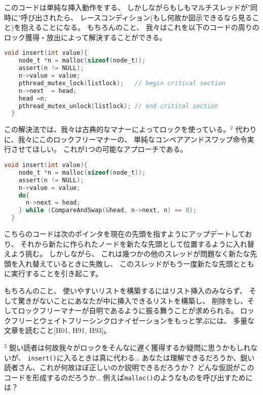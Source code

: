 \documentclass[11pt,a4paper, uplatex]{jsarticle}
\begin{document}
このコードは単純な挿入動作をする、
しかしながらもしもマルチスレッドが"同時に"呼び出されたら、
レースコンディション(もし何故か図示できるなら見ること)を抱えることになる。
もちろんのこと、
我々はこれを以下のコードの周りのロック獲得・放出によって解決することができる。


\begin{lstlisting}[language=c]
  void insert(int value){
    node_t *n = malloc(sizeof(node_t));
    assert(n != NULL);
    n->value = value;
    pthread_mutex_lock(listlock);   // begin critical section
    n->next  = head;
    head =n;
    pthread_mutex_unlock(listlock); // end critical section
  }
\end{lstlisting}

この解決法では、我々は古典的なマナーによってロックを使っている。${}^\text{2}$
代わりに、我々にこのロックフリーマナーの、
単純なコンペアアンドスワップ命令実行させてほしい。
これが1つの可能なアプローチである。


\begin{lstlisting}[language=c]
  void insert(int value){
    node_t *n = malloc(sizeof(node_t));
    assert(n != NULL);
    n->value = value;
    do{
      n->next = head;
    } while (CompareAndSwap(&head, n->next, n) == 0);
  }
\end{lstlisting}

こちらのコードは次のポインタを現在の先頭を指すようにアップデートしており、
それから新たに作られたノードを新たな先頭として位置するように入れ替えよう挑む。
しかしながら、
これは幾つかの他のスレッドが問題なく新たな先頭を入れ替えているときに失敗し、
このスレッドがもう一度新たな先頭とともに実行することを引き起こす。

もちろんのこと、
使いやすいリストを構築するにはリスト挿入のみならず、
そして驚きがないことにあなたが中に挿入できるリストを構築し、
削除をし、そしてロックフリーマナーが自明であるように振る舞うことが求められる。
ロックフリーとウェイトフリーシンクロナイゼーションをもっと学ぶには、
多量な文章を読むこと[H01, H91, H93]。

\hrulefill

${}^\text{2}$ 鋭い読者は何故我々がロックをそんなに遅く獲得するか疑問に思うかもしれないが、
\texttt{insert()}に入るときは真に代わる…
あなたは理解できるだろうか、鋭い読者さん、これが何故ほぼ正しいのか説明できるだろうか？
どんな仮説がこのコードを形成するのだろうか…
例えば\texttt{malloc()}のようなものを呼び出すためには？
\end{document}
